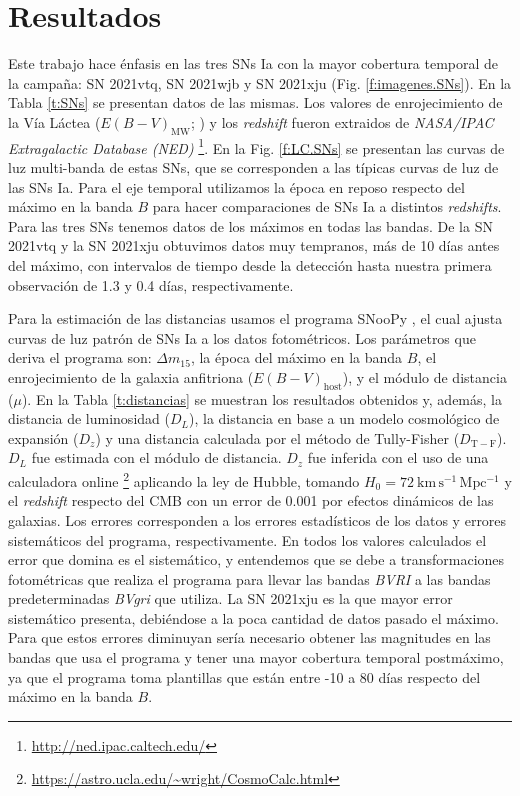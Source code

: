 \documentclass[baaa]{baaa}
\begin{document}
\section{Resultados}\label{sec:resultados}

Este trabajo hace énfasis en las tres SNs Ia con la mayor cobertura temporal de la campaña: SN 2021vtq, SN 2021wjb y SN 2021xju (Fig. \ref{f:imagenes.SNs}). En la Tabla \ref{t:SNs} se presentan datos de las mismas. Los valores de enrojecimiento de la Vía Láctea ($E(B-V)_\mathrm{MW}$; \citealp[]{extincion}) y los {\em redshift} fueron extraidos de {\em NASA/IPAC Extragalactic Database (NED)} \footnote{\url{http://ned.ipac.caltech.edu/}}.
En la Fig. \ref{f:LC.SNs} se presentan las curvas de luz multi-banda de estas SNs, que se corresponden a las típicas curvas de luz de las SNs Ia. Para el eje temporal utilizamos la época en reposo respecto del máximo en la banda $B$ para hacer comparaciones de SNs Ia a distintos {\em redshifts}. Para las tres SNs tenemos datos de los máximos en todas las bandas. De la SN 2021vtq y la SN 2021xju obtuvimos datos muy tempranos, más de 10 días antes del máximo, con intervalos de tiempo desde la detección hasta nuestra primera observación de 1.3 y 0.4 días, respectivamente.

Para la estimación de las distancias usamos el programa {\sc SNooPy} \citep{2011.Burns}, el cual ajusta curvas de luz patrón de SNs Ia a los datos fotométricos. Los parámetros que deriva el programa son: $\Delta m_{15}$, la época del máximo en la banda $B$, el enrojecimiento de la galaxia anfitriona ($E(B-V)_\mathrm{host}$), y el módulo de distancia ($\mu$). En la Tabla \ref{t:distancias} se muestran los resultados obtenidos y, además, la distancia de luminosidad ($D_L$), la distancia en base a un modelo cosmológico de expansión ($D_z$) y una distancia calculada por el método de Tully-Fisher ($D_\mathrm{T-F}$). $D_L$ fue estimada con el módulo de distancia. $D_z$ fue inferida con el uso de una calculadora online \footnote{\url{https://astro.ucla.edu/~wright/CosmoCalc.html}} aplicando la ley de Hubble, tomando $H_0 = 72 ~ \mathrm{km\, s^{-1} \, Mpc^{-1}}$ y el {\em redshift} respecto del CMB con un error de 0.001 por efectos dinámicos de las galaxias. Los errores corresponden a los errores estadísticos de los datos y errores sistemáticos del programa, respectivamente. En todos los valores calculados el error que domina es el sistemático, y entendemos que se debe a transformaciones fotométricas que realiza el programa para llevar las bandas \textit{BVRI} a las bandas predeterminadas \textit{BVgri} que utiliza. La SN 2021xju es la que mayor error sistemático presenta, debiéndose a la poca cantidad de datos pasado el máximo. Para que estos errores diminuyan sería necesario obtener las magnitudes en las bandas que usa el programa y tener una mayor cobertura temporal postmáximo, ya que el programa toma plantillas que están entre -10 a 80 días respecto del máximo en la banda $B$.
\end{document}
